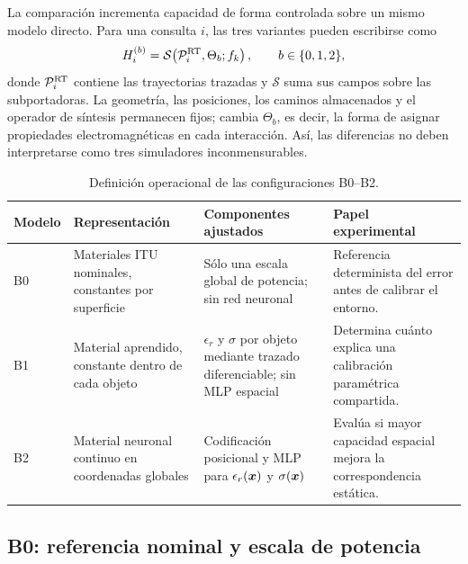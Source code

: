 La comparación incrementa capacidad de forma controlada sobre un mismo modelo
directo. Para una consulta $i$, las tres variantes pueden escribirse como
\begin{equation}
H_i^{(b)}=\mathcal S\!\left(
\mathcal P_i^{\rm RT},\Theta_b;f_k
\right),\qquad b\in\{0,1,2\},
\label{eq:b012_common_synthesis}
\end{equation}
donde $\mathcal P_i^{\rm RT}$ contiene las trayectorias trazadas y $\mathcal S$
suma sus campos sobre las subportadoras. La geometría, las posiciones, los caminos
almacenados y el operador de síntesis permanecen fijos; cambia $\Theta_b$, es decir,
la forma de asignar propiedades electromagnéticas en cada interacción. Así, las
diferencias no deben interpretarse como tres simuladores inconmensurables.

\begin{table}[htbp]
\centering\small
\caption{Definición operacional de las configuraciones B0--B2.}
\label{tab:b012_models}
\begin{tabularx}{\textwidth}{P{1.4cm}P{3.0cm}P{3.8cm}L}
\toprule
Modelo & Representación & Componentes ajustados & Papel experimental\\
\midrule
B0 & Materiales ITU nominales, constantes por superficie & Sólo una escala global
de potencia; sin red neuronal & Referencia determinista del error antes de calibrar
el entorno.\\
B1 & Material aprendido, constante dentro de cada objeto & $\epsilon_r$ y $\sigma$
por objeto mediante trazado diferenciable; sin MLP espacial & Determina cuánto
explica una calibración paramétrica compartida.\\
B2 & Material neuronal continuo en coordenadas globales & Codificación posicional
y MLP para $\epsilon_r(\bm{x})$ y $\sigma(\bm{x})$ & Evalúa si mayor capacidad
espacial mejora la correspondencia estática.\\
\bottomrule
\end{tabularx}
\end{table}

\subsection{B0: referencia nominal y escala de potencia}

